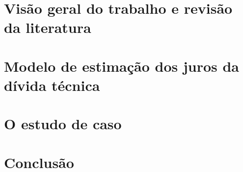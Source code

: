 \documentclass[11pt,twoside,a4paper]{book}
\renewcommand{\chaptermark}[1]{\markboth{\MakeUppercase{#1}}{}}
\begin{document}


\listoffigures            
\listoftables            

\mainmatter

\fancyhead[RE,LO]{\thesection}

\doublespacing

\part{Visão geral do trabalho e revisão da literatura}
	        
	   
\part{Modelo de estimação dos juros da dívida técnica}
	
	
\part{O estudo de caso}
	
	
\part{Conclusão}
	




\renewcommand{\chaptermark}[1]{\markboth{\MakeUppercase{\appendixname\ \thechapter}} {\MakeUppercase{#1}} }
\fancyhead[RE,LO]{}
\appendix
\end{document}
